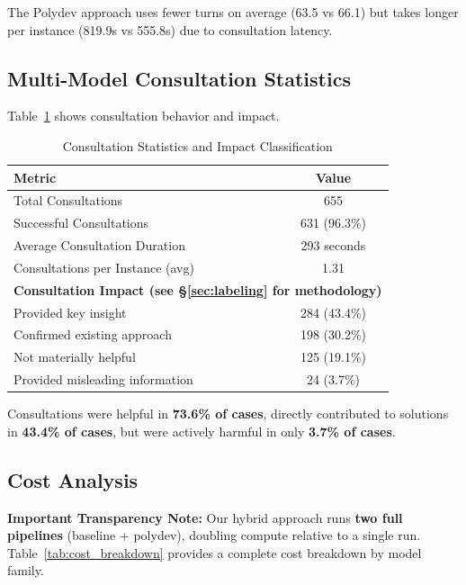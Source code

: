 \documentclass[11pt,a4paper]{article}
\begin{document}
The Polydev approach uses fewer turns on average (63.5 vs 66.1) but takes longer per instance (819.9s vs 555.8s) due to consultation latency.

\subsection{Multi-Model Consultation Statistics}

Table~\ref{tab:consultation_stats} shows consultation behavior and impact.

\begin{table}[h]
\centering
\caption{Consultation Statistics and Impact Classification}
\label{tab:consultation_stats}
\begin{tabular}{lc}
\toprule
\textbf{Metric} & \textbf{Value} \\
\midrule
Total Consultations & 655 \\
Successful Consultations & 631 (96.3\%) \\
Average Consultation Duration & 293 seconds \\
Consultations per Instance (avg) & 1.31 \\
\midrule
\multicolumn{2}{l}{\textbf{Consultation Impact (see \S\ref{sec:labeling} for methodology)}} \\
\midrule
Provided key insight & 284 (43.4\%) \\
Confirmed existing approach & 198 (30.2\%) \\
Not materially helpful & 125 (19.1\%) \\
Provided misleading information & 24 (3.7\%) \\
\bottomrule
\end{tabular}
\end{table}

Consultations were helpful in \textbf{73.6\% of cases}, directly contributed to solutions in \textbf{43.4\% of cases}, but were actively harmful in only \textbf{3.7\% of cases}.

\subsection{Cost Analysis}

\textbf{Important Transparency Note:} Our hybrid approach runs \textbf{two full pipelines} (baseline + polydev), doubling compute relative to a single run. Table~\ref{tab:cost_breakdown} provides a complete cost breakdown by model family.
\end{document}

